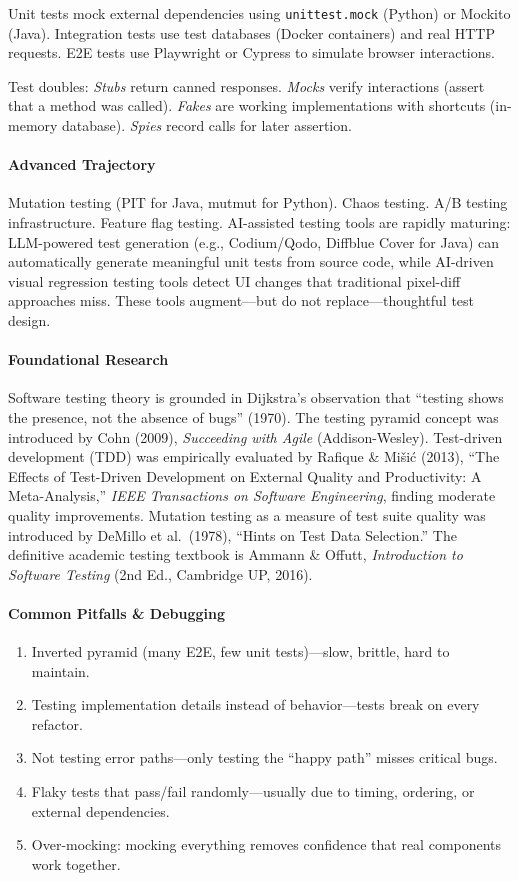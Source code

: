 \documentclass[11pt, a4paper, oneside]{report}
\begin{document}
Unit tests mock external dependencies using \texttt{unittest.mock} (Python) or Mockito (Java). Integration tests use test databases (Docker containers) and real HTTP requests. E2E tests use Playwright or Cypress to simulate browser interactions.

Test doubles: \emph{Stubs} return canned responses. \emph{Mocks} verify interactions (assert that a method was called). \emph{Fakes} are working implementations with shortcuts (in-memory database). \emph{Spies} record calls for later assertion.

\paragraph{Advanced Trajectory} Mutation testing (PIT for Java, mutmut for Python). Chaos testing. A/B testing infrastructure. Feature flag testing. AI-assisted testing tools are rapidly maturing: LLM-powered test generation (e.g., Codium/Qodo, Diffblue Cover for Java) can automatically generate meaningful unit tests from source code, while AI-driven visual regression testing tools detect UI changes that traditional pixel-diff approaches miss. These tools augment---but do not replace---thoughtful test design.


\paragraph{Foundational Research} Software testing theory is grounded in Dijkstra's observation that ``testing shows the presence, not the absence of bugs'' (1970). The testing pyramid concept was introduced by Cohn (2009), \emph{Succeeding with Agile} (Addison-Wesley). Test-driven development (TDD) was empirically evaluated by Rafique \& Mi\v{s}i\'c (2013), ``The Effects of Test-Driven Development on External Quality and Productivity: A Meta-Analysis,'' \emph{IEEE Transactions on Software Engineering}, finding moderate quality improvements. Mutation testing as a measure of test suite quality was introduced by DeMillo et al.\ (1978), ``Hints on Test Data Selection.'' The definitive academic testing textbook is Ammann \& Offutt, \emph{Introduction to Software Testing} (2nd Ed., Cambridge UP, 2016).

\paragraph{Common Pitfalls \& Debugging}
\begin{enumerate}[leftmargin=*]
\item Inverted pyramid (many E2E, few unit tests)---slow, brittle, hard to maintain.
\item Testing implementation details instead of behavior---tests break on every refactor.
\item Not testing error paths---only testing the ``happy path'' misses critical bugs.
\item Flaky tests that pass/fail randomly---usually due to timing, ordering, or external dependencies.
\item Over-mocking: mocking everything removes confidence that real components work together.
\end{enumerate}
\end{document}
